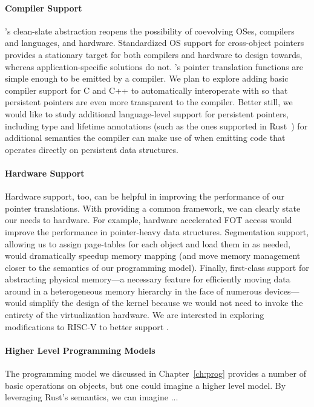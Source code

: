 \paragraph{Compiler Support}
\Twizzler's clean-slate \NVM abstraction reopens the possibility of coevolving OSes, compilers and
languages, and hardware.
Standardized OS support for cross-object pointers provides a stationary target for both
compilers and hardware to design towards, whereas application-specific solutions do not.
\Twizzler's pointer translation functions are simple enough to be emitted by a compiler. We plan
to explore adding basic compiler support for C and C++ to automatically interoperate with
\Twizzler so that persistent pointers are even more transparent to the compiler. Better still,
we would like to study additional language-level support for persistent pointers, including type
and lifetime annotations (such as the ones supported in Rust~\cite{rust}) for additional semantics the
compiler can make use of when emitting code that operates directly on persistent data
structures.

\paragraph{Hardware Support}
Hardware support, too, can be helpful in improving the performance of our pointer translations.
With \Twizzler providing a common framework, we can clearly state our needs to hardware. For
example, hardware accelerated FOT access would improve the performance in pointer-heavy data
structures. Segmentation support, allowing us to assign page-tables for each object and load
them in as needed, would dramatically speedup memory mapping (and move memory management closer
to the semantics of our programming model). Finally, first-class support for abstracting
physical memory---a necessary feature for efficiently moving data around in a heterogeneous
memory hierarchy in the face of numerous devices---would simplify the design of the kernel
because we would not need to invoke the entirety of the virtualization hardware. We are
interested in exploring modifications to RISC-V to better support \Twizzler.

\paragraph{Higher Level Programming Models}

The programming model we discussed in Chapter~\ref{ch:prog} provides a number of basic operations on objects, but one
could imagine a higher level model. By leveraging Rust's semantics, we can imagine ... 
\iffalse

